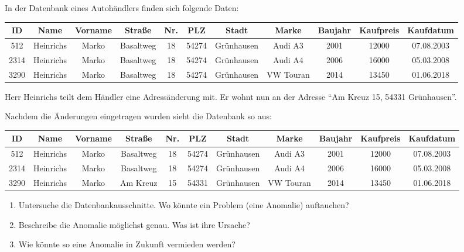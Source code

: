 \documentclass[10pt, a5paper,landscape]{arbeitsblatt}
\renewcommand{\ReiheTitel}[1][\Titel]{%
 \begin{minipage}{.49\textwidth}%
	\usekomafont{titel}{#1}%
 \end{minipage}\hfill\begin{minipage}{.49\textwidth}%
	\hspace*{\fill}\usekomafont{reihe}{\Reihe}%
 \end{minipage}
 \titlerule%
}
\begin{document}
\ReiheTitel

In der Datenbank eines Autohändlers finden sich folgende Daten:

{\footnotesize
\begin{tabular}{|*{11}{c|}}\hline
	\rowcolor{ab.tabelle.kopf.hg} ID & Name & Vorname & Straße & Nr. & PLZ & Stadt & Marke & Baujahr & Kaufpreis & Kaufdatum \\ \hline
	512 & Heinrichs & Marko & Basaltweg & 18 & 54274 & Grünhausen & Audi A3 & 2001 & 12000 & 07.08.2003 \\\hline
	2314 & Heinrichs & Marko & Basaltweg & 18 & 54274 & Grünhausen & Audi A4 & 2006 & 16000 & 05.03.2008 \\\hline
	3290 & Heinrichs & Marko & Basaltweg & 18 & 54274 & Grünhausen & VW Touran & 2014 & 13450 & 01.06.2018 \\\hline
\end{tabular}}

Herr Heinrichs teilt dem Händler eine Adressänderung mit. Er wohnt nun an der Adresse \enquote{Am Kreuz 15, 54331 Grünhausen}.

Nachdem die Änderungen eingetragen wurden sieht die Datenbank so aus:

{\footnotesize
\begin{tabular}{|*{11}{c|}}\hline
	\rowcolor{ab.tabelle.kopf.hg} ID & Name & Vorname & Straße & Nr. & PLZ & Stadt & Marke & Baujahr & Kaufpreis & Kaufdatum \\ \hline
	512 & Heinrichs & Marko & Basaltweg & 18 & 54274 & Grünhausen & Audi A3 & 2001 & 12000 & 07.08.2003 \\\hline
	2314 & Heinrichs & Marko & Basaltweg & 18 & 54274 & Grünhausen & Audi A4 & 2006 & 16000 & 05.03.2008 \\\hline
	3290 & Heinrichs & Marko & Am Kreuz & 15 & 54331 & Grünhausen & VW Touran & 2014 & 13450 & 01.06.2018 \\\hline
\end{tabular}}

\vspace{1em}
\begin{aufgabe}
\begin{enumerate}
	\item Untersuche die Datenbankausschnitte. Wo könnte ein Problem (eine Anomalie) auftauchen?
	\item Beschreibe die Anomalie möglichst genau. Was ist ihre Ursache?
	\item Wie könnte so eine Anomalie in Zukunft vermieden werden?
\end{enumerate}
\end{aufgabe}
\end{document}
